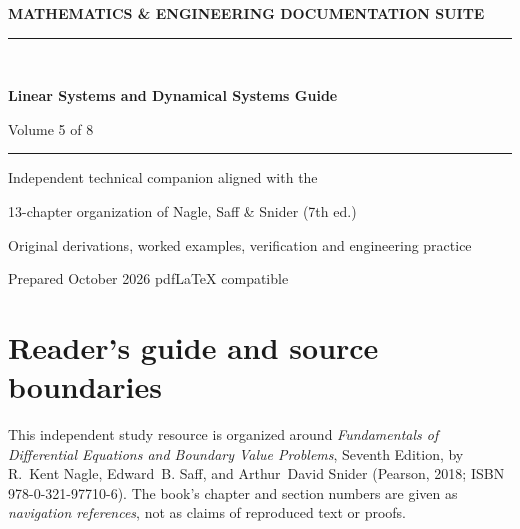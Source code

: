\documentclass[11pt,letterpaper,oneside]{report}
\theoremstyle{definition}\newtheorem{definition}[theorem]{Definition}
\theoremstyle{remark}\newtheorem{remark}[theorem]{Remark}
\begin{document}
\hypersetup{pageanchor=false}%
\begin{titlepage}
\pagecolor{navy}\color{white}
\vspace*{0.75in}
{\sffamily\bfseries\large MATHEMATICS \& ENGINEERING DOCUMENTATION SUITE\\[12pt]}
{\color{cyan!40}\rule{\textwidth}{2pt}}\\[1.0in]
{\sffamily\bfseries\fontsize{29}{36}\selectfont Linear Systems and Dynamical Systems Guide\par}
\vspace{0.45in}
{\Large Volume 5 of 8}\par\vspace{0.55in}
{\color{cyan!30}\rule{0.50\textwidth}{1pt}}\par\vspace{0.3in}
{\large Independent technical companion aligned with the\par}
{\large 13-chapter organization of Nagle, Saff \& Snider (7th ed.)\par}
\vfill
{\large Original derivations, worked examples, verification and engineering practice\par}\vspace{0.3in}
{\small Prepared October 2026 \quad\textbullet\quad pdf\LaTeX{} compatible\par}
\end{titlepage}\hypersetup{pageanchor=true}
\nopagecolor\color{ink}
\chapter*{Reader's guide and source boundaries}
This independent study resource is organized around \emph{Fundamentals of Differential Equations and Boundary Value Problems}, Seventh Edition, by R.~Kent Nagle, Edward~B. Saff, and Arthur~David Snider (Pearson, 2018; ISBN 978-0-321-97710-6). The book's chapter and section numbers are given as \emph{navigation references}, not as claims of reproduced text or proofs.
\end{document}
